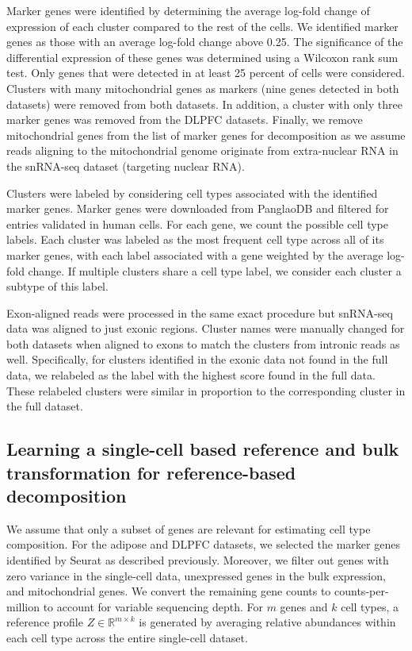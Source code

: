 Marker genes were identified by determining the average log-fold change of expression of each cluster compared to the rest of the cells. We identified marker genes as those with an average log-fold change above 0.25. The significance of the differential expression of these genes was determined using a Wilcoxon rank sum test. Only genes that were detected in at least 25 percent of cells were considered. Clusters with many mitochondrial genes as markers (nine genes detected in both datasets) were removed from both datasets. In addition, a cluster with only three marker genes was removed from the DLPFC datasets. Finally, we remove mitochondrial genes from the list of marker genes for decomposition as we assume reads aligning to the mitochondrial genome originate from extra-nuclear RNA in the snRNA-seq dataset (targeting nuclear RNA). 

Clusters were labeled by considering cell types associated with the identified marker genes. Marker genes were downloaded from PanglaoDB\cite{Franzen2019-nb} and filtered for entries validated in human cells. For each gene, we count the possible cell type labels. Each cluster was labeled as the most frequent cell type across all of its marker genes, with each label associated with a gene weighted by the average log-fold change. If multiple clusters share a cell type label, we consider each cluster a subtype of this label. 

Exon-aligned reads were processed in the same exact procedure but snRNA-seq data was aligned to just exonic regions. Cluster names were manually changed for both datasets when aligned to exons to match the clusters from intronic reads as well. Specifically, for clusters identified in the exonic data not found in the full data, we relabeled as the label with the highest score found in the full data. These relabeled clusters were similar in proportion to the corresponding cluster in the full dataset.

\subsection{Learning a single-cell based reference and bulk transformation for reference-based decomposition}

We assume that only a subset of genes are relevant for estimating cell type composition. For the adipose and DLPFC datasets, we selected the marker genes identified by Seurat as described previously. Moreover, we filter out genes with zero variance in the single-cell data, unexpressed genes in the bulk expression, and mitochondrial genes. We convert the remaining gene counts to counts-per-million to account for variable sequencing depth. For $m$ genes and $k$ cell types, a reference profile $Z \in \mathbb{R}^{m \times k}$ is generated by averaging relative abundances within each cell type across the entire single-cell dataset.

